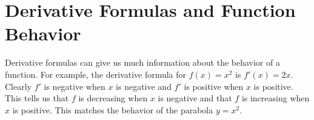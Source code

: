 \documentclass[10pt,oneside,]{book}
\theoremstyle{plain}
\theoremstyle{definition}
\numberwithin{equation}{section}
\newcommand{\fe}[2]{#1\mathopen{}\left(#2\right)\mathclose{}}
\newcommand{\fd}[1]{#1'}
\begin{document}
\section[Derivative Formulas and Function Behavior]{Derivative Formulas and Function Behavior}\label{section-derivative-formulas-and-function-behavior}
Derivative formulas can give us much information about the behavior of a function.  For example, the derivative formula for \(\fe{f}{x}=x^2\) is \(\fe{\fd{f}}{x}=2x\).  Clearly \(\fd{f}\) is negative when \(x\) is negative and \(\fd{f}\) is positive when \(x\) is positive.  This tells us that \(f\) is decreasing when \(x\) is negative and that \(f\) is increasing when \(x\) is positive.  This matches the behavior of the parabola \(y=x^2\).%
\typeout{************************************************}
\typeout{************************************************}
\end{document}
